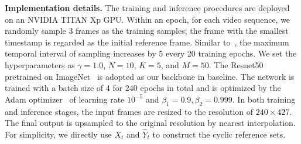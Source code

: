 \documentclass{article}
\begin{document}
\textbf{Implementation details.} The training and inference procedures are deployed on an NVIDIA TITAN Xp GPU. Within an epoch, for each video sequence, we randomly sample 3 frames as the training samples; the frame with the smallest timestamp is regarded as the initial reference frame. Similar to~\cite{Oh_2019_ICCV}, the maximum temporal interval of sampling increases by 5 every 20 training epochs. We set the hyperparameters as $\gamma=1.0$, $N=10$, $K=5$, and $M=50$. The Resnet50~\cite{He_2016_CVPR} pretrained on ImageNet~\cite{imagenet_cvpr09} is adopted as our backbone in baseline. The network is trained with a batch size of 4 for 240 epochs in total and is optimized by the Adam optimizer~\cite{adam2014method} of learning rate $10^{-5}$ and $\beta_1=0.9, \beta_2=0.999$. In both training and inference stages, the input frames are resized to the resolution of $240 \times 427$. The final output is upsampled to the original resolution by nearest interpolation. For simplicity, we directly use $X_{t}$ and $\widehat{Y}_{t}$ to construct the cyclic reference sets. 
\end{document}
